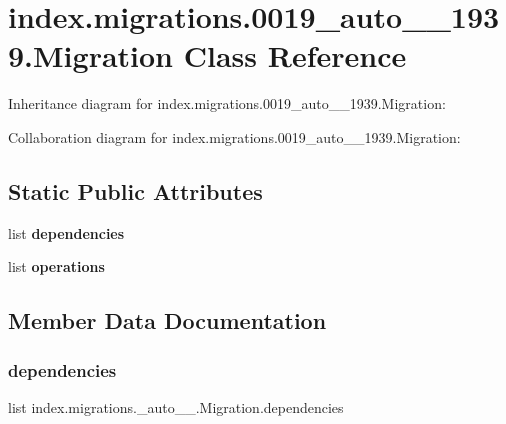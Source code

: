 \hypertarget{classindex_1_1migrations_1_10019__auto__20171025__1939_1_1Migration}{}\section{index.\+migrations.0019\+\_\+auto\+\_\+\_\+1939.Migration Class Reference}
\label{classindex_1_1migrations_1_10019__auto__20171025__1939_1_1Migration}


Inheritance diagram for index.\+migrations.0019\+\_\+auto\+\_\+\_\+1939.Migration\+:


Collaboration diagram for index.\+migrations.0019\+\_\+auto\+\_\+\_\+1939.Migration\+:
\subsection*{Static Public Attributes}
\begin{DoxyCompactItemize}
\item 
list {\bfseries dependencies}
\item 
list {\bfseries operations}
\end{DoxyCompactItemize}


\subsection{Member Data Documentation}
\mbox{\label{classindex_1_1migrations_1_10019__auto__20171025__1939_1_1Migration_ab007a154082bdd2b2f1c07249f5b7a06}} 
\subsubsection{\texorpdfstring{dependencies}{dependencies}}
{\footnotesize\ttfamily list index.\+migrations.\+\_\+auto\+\_\+\_.\+Migration.\+dependencies\hspace{0.3cm}{\ttfamily [static]}}

